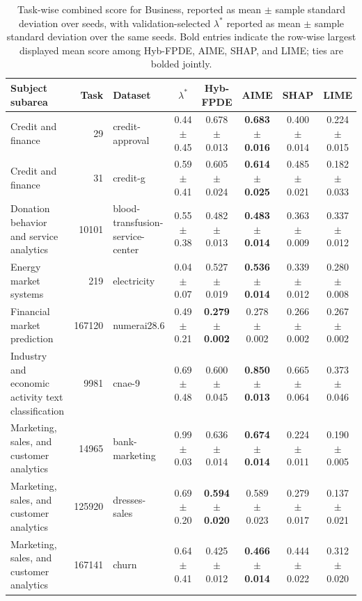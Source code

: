 \begin{table}[!tbp]
    \caption{Task-wise combined score for Business, reported as mean $\pm$ sample standard deviation over seeds, with validation-selected $\lambda^*$ reported as mean $\pm$ sample standard deviation over the same seeds. Bold entries indicate the row-wise largest displayed mean score among Hyb-FPDE, AIME, SHAP, and LIME; ties are bolded jointly.}
    \label{tab:taskwise_combined_scores_sd_business}
    \centering
    \scriptsize
    \setlength{\tabcolsep}{3pt}
    \renewcommand{\arraystretch}{1.03}
    \begin{tabular}{lrlccccc}
        \toprule
        Subject subarea & Task & Dataset & $\lambda^*$ & Hyb-FPDE & AIME & SHAP & LIME  \\
        \midrule
        Credit and finance & 29 & credit-approval & 0.44 $\pm$ 0.45 & 0.678 $\pm$ 0.013 & \textbf{0.683 $\pm$ 0.016} & 0.400 $\pm$ 0.014 & 0.224 $\pm$ 0.015 \\
        Credit and finance & 31 & credit-g & 0.59 $\pm$ 0.41 & 0.605 $\pm$ 0.024 & \textbf{0.614 $\pm$ 0.025} & 0.485 $\pm$ 0.021 & 0.182 $\pm$ 0.033 \\
        Donation behavior and service analytics & 10101 & blood-transfusion-service-center & 0.55 $\pm$ 0.38 & 0.482 $\pm$ 0.013 & \textbf{0.483 $\pm$ 0.014} & 0.363 $\pm$ 0.009 & 0.337 $\pm$ 0.012 \\
        Energy market systems & 219 & electricity & 0.04 $\pm$ 0.07 & 0.527 $\pm$ 0.019 & \textbf{0.536 $\pm$ 0.014} & 0.339 $\pm$ 0.012 & 0.280 $\pm$ 0.008 \\
        Financial market prediction & 167120 & numerai28.6 & 0.49 $\pm$ 0.21 & \textbf{0.279 $\pm$ 0.002} & 0.278 $\pm$ 0.002 & 0.266 $\pm$ 0.002 & 0.267 $\pm$ 0.002 \\
        Industry and economic activity text classification & 9981 & cnae-9 & 0.69 $\pm$ 0.48 & 0.600 $\pm$ 0.045 & \textbf{0.850 $\pm$ 0.013} & 0.665 $\pm$ 0.064 & 0.373 $\pm$ 0.046 \\
        Marketing, sales, and customer analytics & 14965 & bank-marketing & 0.99 $\pm$ 0.03 & 0.636 $\pm$ 0.014 & \textbf{0.674 $\pm$ 0.014} & 0.224 $\pm$ 0.011 & 0.190 $\pm$ 0.005 \\
        Marketing, sales, and customer analytics & 125920 & dresses-sales & 0.69 $\pm$ 0.20 & \textbf{0.594 $\pm$ 0.020} & 0.589 $\pm$ 0.023 & 0.279 $\pm$ 0.017 & 0.137 $\pm$ 0.021 \\
        Marketing, sales, and customer analytics & 167141 & churn & 0.64 $\pm$ 0.41 & 0.425 $\pm$ 0.012 & \textbf{0.466 $\pm$ 0.014} & 0.444 $\pm$ 0.022 & 0.312 $\pm$ 0.020 \\
        \bottomrule
    \end{tabular}%
\end{table}

